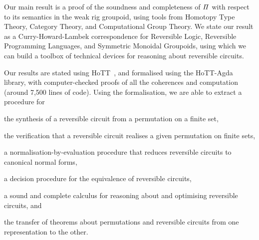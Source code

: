 





Our main result is a proof of the soundness and completeness of $\mathit{\Pi}$ with respect to its semantics in the weak rig
groupoid, using tools from Homotopy Type Theory, Category Theory, and Computational Group Theory. We state our result as
a Curry-Howard-Lambek correspondence for Reversible Logic, Reversible Programming Languages, and Symmetric Monoidal
Groupoids, using which we can build a toolbox of technical devices for reasoning about reversible circuits.

Our results are stated using HoTT~\cite{univalentfoundationsprogramHomotopyTypeTheory2013}, and formalised using the
HoTT-Agda library, with computer-checked proofs of all the coherences and computation (around 7,500 lines of code).
Using the formalisation, we are able to extract a procedure for
\begin{enumerate*}[label=\alph*]
      \item the synthesis of a reversible circuit from a permutation on a finite set,
      \item the verification that a reversible circuit realises a given permutation on finite sets,
      \item a normalisation-by-evaluation procedure that reduces reversible circuits to canonical normal forms,
      \item a decision procedure for the equivalence of reversible circuits,
      \item a sound and complete calculus for reasoning about and optimising reversible circuits, and
      \item the transfer of theorems about permutations and reversible circuits from one representation to the other.
\end{enumerate*}

